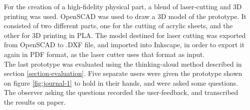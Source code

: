 For the creation of a high-fidelity physical part, a blend of laser-cutting and 3D printing was used. OpenSCAD was used to draw a 3D model of the prototype. It consisted of two different parts, one for the cutting of acrylic sheets, and the other for 3D printing in PLA. The model destined for laser cutting was exported from OpenSCAD to .DXF file, and imported into Inkscape, in order to export it again in PDF format, as the laser cutter uses that format as input. \\

The last prototype was evaluated using the thinking-aloud method described in section \ref{section-evaluation}. Five separate users were given the prototype shown on figure \ref{fig:journal-1} to hold in their hands, and were asked some questions. The observer asking the questions recorded the user-feedback, and transcribed the results on paper. 

















